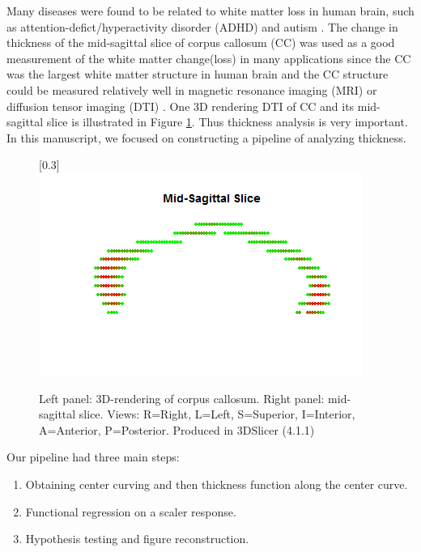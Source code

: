 \documentclass[12pt]{article}
\begin{document}
Many diseases were found to be related to white matter loss in human brain, such as attention-defict/hyperactivity disorder (ADHD) \cite{Luders2009decreased} and autism \cite{vidal2006mapping}. The change in thickness of the mid-sagittal slice of corpus callosum (CC) was used as a good measurement of the white matter change(loss) in many applications since the CC was the largest white matter structure in human brain and the CC structure could be measured relatively well in magnetic resonance imaging (MRI) or diffusion tensor imaging (DTI) \cite{reich2010automated}. One 3D rendering DTI of CC and its mid-sagittal slice is illustrated in Figure \ref{fig.corpus}. Thus thickness analysis is very important. In this manuscript, we focused on constructing a pipeline of analyzing thickness.\
\begin{figure}[H]
\caption[Corpus callosum data illustration]{\footnotesize Left panel: 3D-rendering of corpus callosum. Right panel: mid-sagittal slice. Views: R=Right, L=Left, S=Superior, I=Interior, A=Anterior, P=Posterior. Produced in 3DSlicer (4.1.1)}
\label{fig.corpus}
\begin{minipage}[b]{0.45\linewidth}
\centering
{}
\end{minipage}
\begin{minipage}[b]{0.45\linewidth}
\scalebox{0.4}[0.3]{\includegraphics{pics/corpusA3.png}}
\end{minipage}
\end{figure}
Our pipeline had three main steps:
\begin{enumerate}
\item Obtaining center curving and then thickness function along the center curve.
\item Functional regression on a scaler response.
\item Hypothesis testing and figure reconstruction.
\end{enumerate}\
\end{document}
